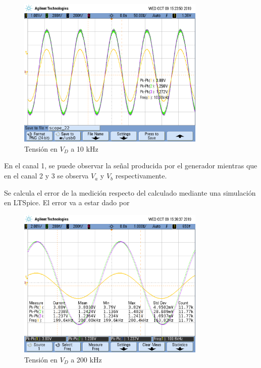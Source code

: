 \begin{figure}[H]
\centering
\includegraphics[width=0.8\textwidth,trim={1cm 3.45cm 0.1cm 5cm},clip]{Mediciones/Tensiones_10_KHz}
\caption{Tensión en $V_D$ a 10 kHz}
\label{fig:Tensiones_10_KHz}
\end{figure}
En el canal 1, se puede observar la señal producida por el generador mientras que en el canal 2 y 3 se observa $V_a$ y $V_b$ respectivamente.

Se calcula el error de la medición respecto del calculado mediante una simulación en LTSpice. El error va a estar dado por 

\begin{figure}[H]
\centering
\includegraphics[width=0.8\textwidth,trim={1cm 3.45cm 0.1cm 5cm},clip]{Mediciones/Tensiones_200_KHz}
\caption{Tensión en $V_D$ a 200 kHz}
\label{fig:Tensiones_200_KHz}
\end{figure}

